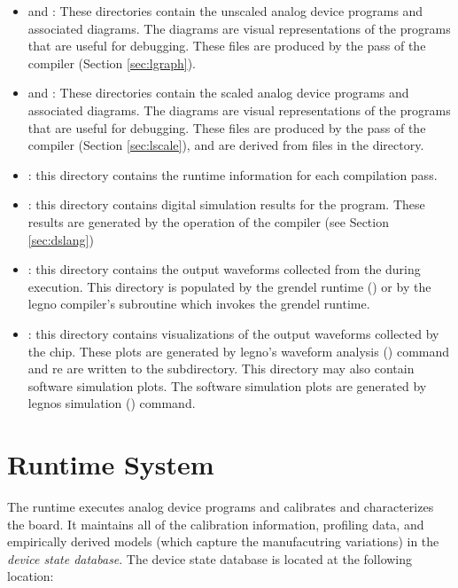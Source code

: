 \begin{itemize}
\item{} and : These directories contain the
  unscaled analog device programs and associated diagrams. The diagrams are visual
  representations of the programs that are useful for debugging. These files are
  produced by the  pass of the \legno compiler (Section \ref{sec:lgraph}).
\item{} and : These directories contain the
  scaled analog device programs and associated diagrams. The diagrams are visual
  representations of the programs that are useful for debugging. These files are
  produced by the  pass of the \legno compiler (Section \ref{sec:lscale}), and are derived from
  files in the  directory.
\item{}: this directory contains the runtime information for each
  compilation pass.
\item{}: this directory contains digital simulation results for the
  program. These results are generated by the  operation of the
  \legno compiler (see Section \ref{sec:dslang})
\item{}: this directory contains the output waveforms
  collected from the \hcdc during execution. This directory is populated by
  the grendel runtime () or by the legno compiler's 
  subroutine which invokes the grendel runtime.
  
\item{}: this directory contains visualizations of the output
  waveforms collected by the \hcdc chip. These plots are generated by legno's
  waveform analysis () command and re are written to the 
  subdirectory. This directory may also contain software simulation plots. The
  software simulation plots are generated by legnos simulation ()
  command.
  
\end{itemize}

\section{Runtime System}

The \grendel runtime executes analog device programs and calibrates and
characterizes the board. It maintains all of the calibration information,
profiling data, and empirically derived models (which capture the manufacutring
variations) in the \textit{device state database}. The device state database is
located at the following location:

